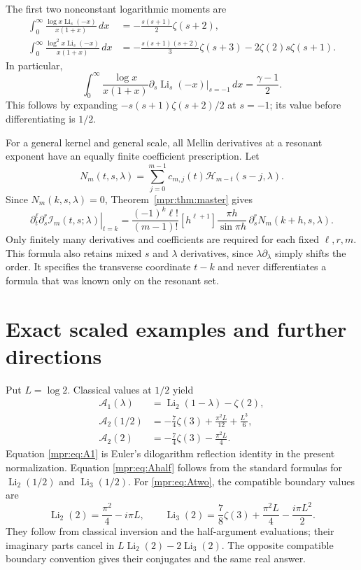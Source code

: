 The first two nonconstant logarithmic moments are
\begin{align*}
 \int_0^\infty\frac{\log x\operatorname{Li}_s(-x)}{x(1+x)}\,dx
   &=-\frac{s(s+1)}2\zeta(s+2),\\
 \int_0^\infty\frac{\log^2x\operatorname{Li}_s(-x)}{x(1+x)}\,dx
   &=-\frac{s(s+1)(s+2)}3\zeta(s+3)
                           -2\zeta(2)s\zeta(s+1).
\end{align*}
In particular,
\[
 \int_0^\infty\frac{\log x}{x(1+x)}
      \left.\partial_s\operatorname{Li}_s(-x)\right|_{s=-1}\,dx
       =\frac{\gamma-1}{2}.
\]
This follows by expanding
$-s(s+1)\zeta(s+2)/2$ at $s=-1$; its value before differentiating is
$1/2$.

For a general kernel and general scale, all Mellin derivatives at a
resonant exponent have an equally finite coefficient prescription.
Let
\[
 N_m(t,s,\lambda)
     =\sum_{j=0}^{m-1}c_{m,j}(t)\mathcal H_{m-t}(s-j,\lambda).
\]
Since $N_m(k,s,\lambda)=0$, Theorem~\ref{mpr:thm:master} gives
\begin{equation}\label{mpr:eq:mixedcompiler}
 \left.\partial_t^\ell\partial_s^r
                      \mathcal I_m(t,s;\lambda)\right|_{t=k}
 =\frac{(-1)^k\ell!}{(m-1)!}
   [h^{\ell+1}]\frac{\pi h}{\sin\pi h}\,
                       \partial_s^r N_m(k+h,s,\lambda).
\end{equation}
Only finitely many derivatives and coefficients are required for each
fixed $\ell,r,m$.  This formula also retains mixed $s$ and $\lambda$
derivatives, since $\lambda\partial_\lambda$ simply shifts the order.
It specifies the transverse coordinate $t-k$ and never differentiates a
formula that was known only on the resonant set.

\section{Exact scaled examples and further directions}
\label{mpr:sec:examples}

Put $L=\log2$.  Classical values at $1/2$ yield
\begin{align}
 \mathcal A_1(\lambda)
       &=\operatorname{Li}_2(1-\lambda)-\zeta(2),
            \label{mpr:eq:A1}\\
 \mathcal A_2(1/2)
       &=-\frac74\zeta(3)+\frac{\pi^2L}{12}+
                                               \frac{L^3}{6},
            \label{mpr:eq:Ahalf}\\
 \mathcal A_2(2)
       &=-\frac74\zeta(3)-\frac{\pi^2L}{4}.
            \label{mpr:eq:Atwo}
\end{align}
Equation \eqref{mpr:eq:A1} is Euler's dilogarithm reflection identity in
the present normalization.  Equation \eqref{mpr:eq:Ahalf} follows from
the standard formulas for $\operatorname{Li}_2(1/2)$ and
$\operatorname{Li}_3(1/2)$.
For \eqref{mpr:eq:Atwo}, the compatible boundary values are
\[
 \operatorname{Li}_2(2)=\frac{\pi^2}{4}-i\pi L,\qquad
 \operatorname{Li}_3(2)=\frac78\zeta(3)+\frac{\pi^2L}{4}
                                           -\frac{i\pi L^2}{2}.
\]
They follow from classical inversion and the half-argument evaluations;
their imaginary parts cancel in $L\operatorname{Li}_2(2)
-2\operatorname{Li}_3(2)$.  The opposite compatible boundary convention
gives their conjugates and the same real answer.

